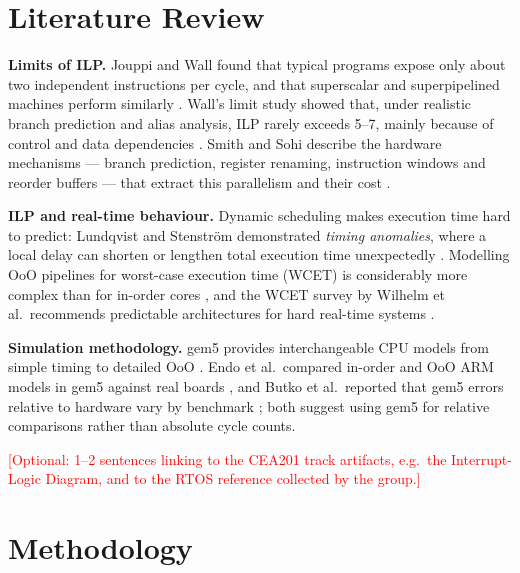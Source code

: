 \documentclass[12pt, a4paper]{article}
\newcommand{\fillin}[1]{\textcolor{red}{#1}}
\begin{document}
\section{Literature Review}
\noindent \textbf{Limits of ILP.} Jouppi and Wall found that typical programs expose only about two independent instructions per cycle, and that superscalar and superpipelined machines perform similarly \cite{JouppiWall1989}. Wall's limit study showed that, under realistic branch prediction and alias analysis, ILP rarely exceeds 5--7, mainly because of control and data dependencies \cite{Wall1991}. Smith and Sohi describe the hardware mechanisms --- branch prediction, register renaming, instruction windows and reorder buffers --- that extract this parallelism and their cost \cite{SmithSohi1995}.

\vspace{0.2cm}
\noindent \textbf{ILP and real-time behaviour.} Dynamic scheduling makes execution time hard to predict: Lundqvist and Stenström demonstrated \emph{timing anomalies}, where a local delay can shorten or lengthen total execution time unexpectedly \cite{Lundqvist1999}. Modelling OoO pipelines for worst-case execution time (WCET) is considerably more complex than for in-order cores \cite{Li2006}, and the WCET survey by Wilhelm et al.\ recommends predictable architectures for hard real-time systems \cite{Wilhelm2008}.

\vspace{0.2cm}
\noindent \textbf{Simulation methodology.} gem5 provides interchangeable CPU models from simple timing to detailed OoO \cite{Binkert2011, LowePower2020}. Endo et al.\ compared in-order and OoO ARM models in gem5 against real boards \cite{Endo2014}, and Butko et al.\ reported that gem5 errors relative to hardware vary by benchmark \cite{Butko2012}; both suggest using gem5 for relative comparisons rather than absolute cycle counts.

\vspace{0.2cm}
\noindent \fillin{[Optional: 1--2 sentences linking to the CEA201 track artifacts, e.g.\ the Interrupt-Logic Diagram, and to the RTOS reference collected by the group.]}

\section{Methodology}
\end{document}
